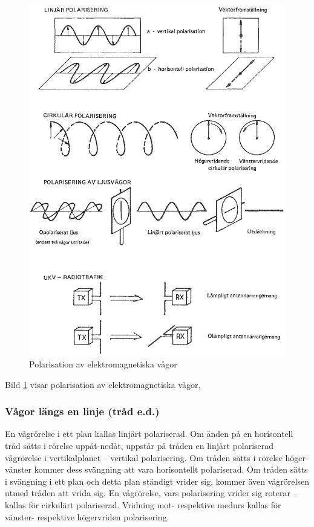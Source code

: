 \begin{figure}
  \includegraphics[width=\textwidth]{images/cropped_pdfs/bild_2_1-14.pdf}
  \caption{Polarisation av elektromagnetiska vågor}
  \label{fig:BildII1-14}
\end{figure}

Bild \ref{fig:BildII1-14} visar polarisation av elektromagnetiska vågor.

\subsubsection{Vågor längs en linje (tråd e.d.)}
En vågrörelse i ett plan kallas linjärt polariserad.
Om änden på en horisontell tråd sätts i rörelse uppåt-nedåt, uppstår på tråden
en linjärt polariserad vågrörelse i vertikalplanet -- vertikal polarisering.
Om tråden sätts i rörelse höger-vänster kommer dess svängning att vara
horisontellt polariserad.
Om tråden sätts i svängning i ett plan och detta plan ständigt vrider sig,
kommer även vågrörelsen utmed tråden att vrida sig.
En vågrörelse, vars polarisering vrider sig roterar -- kallas för cirkulärt
polariserad.
Vridning mot- respektive medurs kallas för vänster- respektive högervriden
polarisering.

